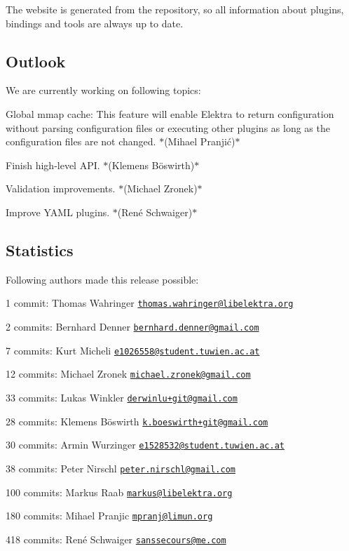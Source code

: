 The website is generated from the repository, so all information about plugins, bindings and tools are always up to date.

\subsection*{Outlook}

We are currently working on following topics\+:


\begin{DoxyItemize}
\item Global mmap cache\+: This feature will enable Elektra to return configuration without parsing configuration files or executing other plugins as long as the configuration files are not changed. $\ast$(Mihael Pranjić)$\ast$
\item Finish high-\/level A\+PI. $\ast$(Klemens Böswirth)$\ast$
\item Validation improvements. $\ast$(Michael Zronek)$\ast$
\item Improve Y\+A\+ML plugins. $\ast$(René Schwaiger)$\ast$
\end{DoxyItemize}

\subsection*{Statistics}

Following authors made this release possible\+:


\begin{DoxyItemize}
\item 1 commit\+: Thomas Wahringer \href{mailto:thomas.wahringer@libelektra.org}{\tt thomas.\+wahringer@libelektra.\+org}
\item 2 commits\+: Bernhard Denner \href{mailto:bernhard.denner@gmail.com}{\tt bernhard.\+denner@gmail.\+com}
\item 7 commits\+: Kurt Micheli \href{mailto:e1026558@student.tuwien.ac.at}{\tt e1026558@student.\+tuwien.\+ac.\+at}
\item 12 commits\+: Michael Zronek \href{mailto:michael.zronek@gmail.com}{\tt michael.\+zronek@gmail.\+com}
\item 33 commits\+: Lukas Winkler \href{mailto:derwinlu+git@gmail.com}{\tt derwinlu+git@gmail.\+com}
\item 28 commits\+: Klemens Böswirth \href{mailto:k.boeswirth+git@gmail.com}{\tt k.\+boeswirth+git@gmail.\+com}
\item 30 commits\+: Armin Wurzinger \href{mailto:e1528532@student.tuwien.ac.at}{\tt e1528532@student.\+tuwien.\+ac.\+at}
\item 38 commits\+: Peter Nirschl \href{mailto:peter.nirschl@gmail.com}{\tt peter.\+nirschl@gmail.\+com}
\item 100 commits\+: Markus Raab \href{mailto:markus@libelektra.org}{\tt markus@libelektra.\+org}
\item 180 commits\+: Mihael Pranjic \href{mailto:mpranj@limun.org}{\tt mpranj@limun.\+org}
\item 418 commits\+: René Schwaiger \href{mailto:sanssecours@me.com}{\tt sanssecours@me.\+com}
\end{DoxyItemize}

